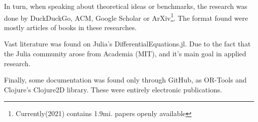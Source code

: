 \documentclass[
12pt,				%
openright,			%
oneside,			%
a4paper,			%
brazil,				%
english,			  %
]{abntex2}
\begin{document}
In turn, when speaking about theoretical ideas or
benchmarks, the research was done by DuckDuckGo, ACM, Google
Scholar or ArXiv\footnote{Currently(2021) contains 1.9mi. papers
  openly available}. The format found were mostly articles of books in
these researches.

Vast literature was found on Julia's
DifferentialEquations.jl. Due to the fact that the Julia community
arose from Academia (MIT), and it's main goal in applied research.

Finally, some documentation was found only through GitHub, as OR-Tools
and Clojure's Clojure2D library. These were entirely electronic publications.




\end{document}
